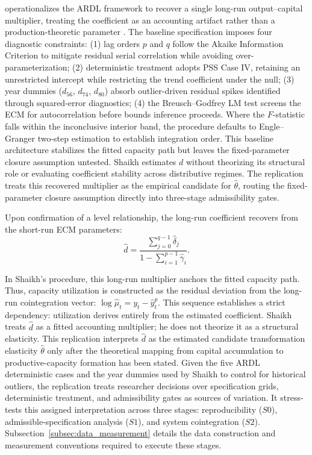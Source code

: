 \documentclass[11pt]{article}
\begin{document}
\citet{Shaikh2016} operationalizes the ARDL framework to recover a single long-run output--capital multiplier, treating the coefficient as an accounting artifact rather than a production-theoretic parameter \citep[Appendix~6.7]{Shaikh2016}. The baseline specification imposes four diagnostic constraints: (1) lag orders $p$ and $q$ follow the Akaike Information Criterion to mitigate residual serial correlation while avoiding over-parameterization; (2) deterministic treatment adopts PSS Case IV, retaining an unrestricted intercept while restricting the trend coefficient under the null; (3) year dummies ($d_{56}$, $d_{74}$, $d_{80}$) absorb outlier-driven residual spikes identified through squared-error diagnostics; (4) the Breusch--Godfrey LM test screens the ECM for autocorrelation before bounds inference proceeds. Where the $F$-statistic falls within the inconclusive interior band, the procedure defaults to Engle--Granger two-step estimation to establish integration order. This baseline architecture stabilizes the fitted capacity path but leaves the fixed-parameter closure assumption untested. Shaikh estimates $d$ without theorizing its structural role or evaluating coefficient stability across distributive regimes. The replication treats this recovered multiplier as the empirical candidate for $\hat{\theta}$, routing the fixed-parameter closure assumption directly into three-stage admissibility gates.

Upon confirmation of a level relationship, the long-run coefficient recovers from the short-run ECM parameters:
\begin{equation}
\hat{d} = \frac{\sum_{j=0}^{q-1} \hat{\delta}_j}{1 - \sum_{i=1}^{p-1} \hat{\gamma}_i}.
\end{equation}

In Shaikh's procedure, this long-run multiplier anchors the fitted capacity path. Thus, capacity utilization is constructed as the residual deviation from the long-run cointegration vector: $\log \hat{\mu}_t = y_t - \hat{y}^p_t$. This sequence establishes a strict dependency: utilization derives entirely from the estimated coefficient. Shaikh treats $\hat{d}$ as a fitted accounting multiplier; he does not theorize it as a structural elasticity. This replication interprets $\hat{d}$ as the estimated candidate transformation elasticity $\hat{\theta}$ only after the theoretical mapping from capital accumulation to productive-capacity formation has been stated. Given the five ARDL deterministic cases and the year dummies used by Shaikh to control for historical outliers, the replication treats researcher decisions over specification grids, deterministic treatment, and admissibility gates as sources of variation. It stress-tests this assigned interpretation across three stages: reproducibility ($S0$), admissible-specification analysis ($S1$), and system cointegration ($S2$). Subsection~\ref{subsec:data_measurement} details the data construction and measurement conventions required to execute these stages.
\end{document}
